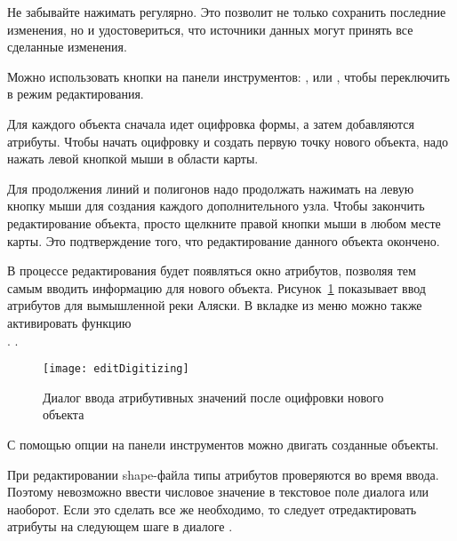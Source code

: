 \begin{Tip}\caption{\textsc{Регулярное сохранение}}
Не забывайте нажимать 
регулярно. Это позволит не только сохранить последние изменения, но и
удостовериться, что источники данных могут принять все сделанные изменения.
\end{Tip}


Можно использовать кнопки на панели инструментов:
,
 или
, чтобы переключить \qg
в режим редактирования.

Для каждого объекта сначала идет оцифровка формы, а затем добавляются атрибуты.
Чтобы начать оцифровку и создать первую точку нового объекта, надо нажать
левой кнопкой мыши в области карты.

Для продолжения линий и полигонов надо продолжать нажимать на левую кнопку
мыши для создания каждого дополнительного узла. Чтобы закончить
редактирование объекта, просто щелкните правой кнопки мыши в любом
месте карты. Это подтверждение того, что редактирование данного объекта
окончено.

В процессе редактирования будет появляться окно атрибутов, позволяя тем
самым вводить информацию для нового объекта.
Рисунок~\ref{fig:vector_digitising} показывает ввод атрибутов для вымышленной реки
Аляски. В вкладке  из меню  \arrow
{} можно также активировать функцию \\
.
.

\begin{figure}[ht]
   \centering
   \texttt{[image: editDigitizing]}
   \caption{Диалог ввода атрибутивных значений после оцифровки нового объекта \wincaption}\label{fig:vector_digitising}
 \end{figure}

С помощью опции  на
панели инструментов можно двигать созданные объекты.

\begin{Tip}\caption{\textsc{Типы значений атрибутов}}
При редактировании shape-файла типы атрибутов проверяются во время ввода.
Поэтому невозможно ввести числовое значение в текстовое поле диалога
 или наоборот. Если это сделать все же необходимо,
то следует отредактировать атрибуты на следующем шаге в диалоге
.
\end{Tip}

